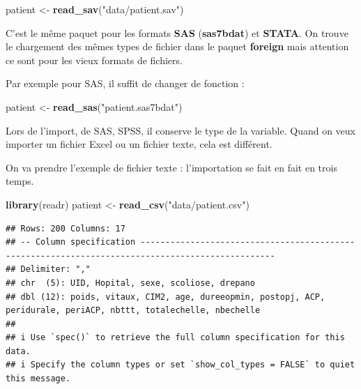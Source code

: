 \documentclass[
]{book}
\newenvironment{Shaded}{\begin{snugshade}}{\end{snugshade}}
\newcommand{\FunctionTok}[1]{\textcolor[rgb]{0.13,0.29,0.53}{\textbf{#1}}}
\newcommand{\NormalTok}[1]{#1}
\newcommand{\OtherTok}[1]{\textcolor[rgb]{0.56,0.35,0.01}{#1}}
\newcommand{\SpecialCharTok}[1]{\textcolor[rgb]{0.81,0.36,0.00}{\textbf{#1}}}
\newcommand{\StringTok}[1]{\textcolor[rgb]{0.31,0.60,0.02}{#1}}
\begin{document}
\begin{Shaded}
\begin{Highlighting}[]
\NormalTok{patient }\OtherTok{\textless{}{-}} \FunctionTok{read\_sav}\NormalTok{(}\StringTok{"data/patient.sav"}\NormalTok{)}
\end{Highlighting}
\end{Shaded}

C'est le même paquet pour les formats \textbf{SAS} (\textbf{sas7bdat}) et \textbf{STATA}. On
trouve le chargement des mêmes types de fichier dans le paquet \textbf{foreign}
mais attention ce sont pour les vieux formats de fichiers.

Par exemple pour SAS, il suffit de changer de fonction :

\begin{Shaded}
\begin{Highlighting}[]
\NormalTok{patient }\OtherTok{\textless{}{-}} \FunctionTok{read\_sas}\NormalTok{(}\StringTok{"patient.sas7bdat"}\NormalTok{)}
\end{Highlighting}
\end{Shaded}

Lors de l'import, de SAS, SPSS, il conserve le type de la variable. Quand on veux
importer un fichier Excel ou un fichier texte, cela est différent.

On va prendre l'exemple de fichier texte : l'importation se fait en fait en
trois temps.

\begin{Shaded}
\begin{Highlighting}[]
\FunctionTok{library}\NormalTok{(readr)}
\NormalTok{patient }\OtherTok{\textless{}{-}} \FunctionTok{read\_csv}\NormalTok{(}\StringTok{"data/patient.csv"}\NormalTok{)}
\end{Highlighting}
\end{Shaded}

\begin{verbatim}
## Rows: 200 Columns: 17
## -- Column specification -------------------------------------------------------------------------------------------------
## Delimiter: ","
## chr  (5): UID, Hopital, sexe, scoliose, drepano
## dbl (12): poids, vitaux, CIM2, age, dureeopmin, postopj, ACP, peridurale, periACP, nbttt, totalechelle, nbechelle
## 
## i Use `spec()` to retrieve the full column specification for this data.
## i Specify the column types or set `show_col_types = FALSE` to quiet this message.
\end{verbatim}

\begin{Shaded}
\end{Shaded}
\end{document}
